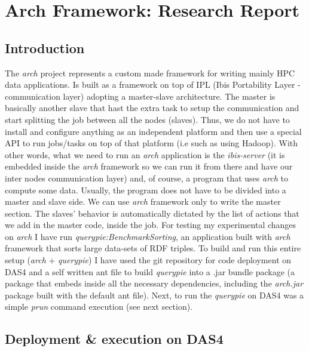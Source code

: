 \section{Arch Framework: Research Report}

\subsection{Introduction}

The \textit{arch} project represents a custom made framework for writing mainly HPC data applications. Is built as a framework on top of IPL (Ibis Portability Layer - communication layer) adopting a master-slave architecture. The master is basically another slave that hast the extra task to setup the communication and start splitting the job between all the nodes (slaves). Thus, we do not have to install and configure anything as an independent platform and then use a special API to run jobs/tasks on top of that platform (i.e such as using Hadoop). With other words, what we need to run an \textit{arch} application is the \textit{ibis-server} (it is embedded inside the \textit{arch} framework so we can run it from there and have our inter nodes communication layer) and, of course, a program that uses \textit{arch} to compute some data. Usually, the program does not have to be divided into a master and slave side. We can use \textit{arch} framework only to write the master section. The slaves' behavior is automatically dictated by the list of actions that we add in the master code, inside the job. For testing my experimental changes on \textit{arch} I have run \textit{querypie:BenchmarkSorting}, an application built with \textit{arch} framework that sorts large data-sets of RDF triples. To build and run this entire setup (\textit{arch} + \textit{querypie}) I have used the git repository for code deployment on DAS4 and a self written ant file \cite{build_file} to build \textit{querypie} into a .jar bundle package (a package that embeds inside all the necessary dependencies, including the \textit{arch.jar} package built with the default ant file). Next, to run the \textit{querypie} on DAS4 was a simple \textit{prun} command execution (see next section).

% 
\subsection{Deployment \& execution on DAS4}

